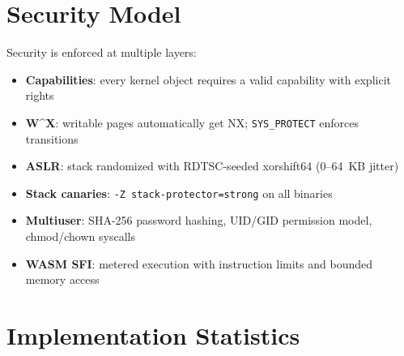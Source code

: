 \documentclass[11pt,letterpaper]{article}
\theoremstyle{definition}
\begin{document}
\section{Security Model}
\label{sec:security}

Security is enforced at multiple layers:
\begin{itemize}[nosep]
    \item \textbf{Capabilities}: every kernel object requires a valid capability with explicit rights
    \item \textbf{W\^{}X}: writable pages automatically get NX; \texttt{SYS\_PROTECT} enforces transitions
    \item \textbf{ASLR}: stack randomized with RDTSC-seeded xorshift64 (0--64~KB jitter)
    \item \textbf{Stack canaries}: \texttt{-Z stack-protector=strong} on all binaries
    \item \textbf{Multiuser}: SHA-256 password hashing, UID/GID permission model, chmod/chown syscalls
    \item \textbf{WASM SFI}: metered execution with instruction limits and bounded memory access
\end{itemize}

\section{Implementation Statistics}
\label{sec:stats}
\end{document}
